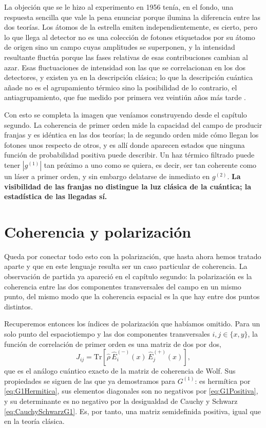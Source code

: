     La objeción que se le hizo al experimento en 1956 tenía, en el fondo, una respuesta sencilla que vale la pena enunciar porque ilumina la diferencia entre las dos teorías. Los átomos de la estrella emiten independientemente, es cierto, pero lo que llega al detector no es una colección de fotones etiquetados por su átomo de origen sino un campo cuyas amplitudes se superponen, y la intensidad resultante fluctúa porque las fases relativas de esas contribuciones cambian al azar. Esas fluctuaciones de intensidad son las que se correlacionan en los dos detectores, y existen ya en la descripción clásica; lo que la descripción cuántica añade no es el agrupamiento térmico sino la posibilidad de lo contrario, el antiagrupamiento, que fue medido por primera vez veintiún años más tarde \citep{kimble1977photon}.

    Con esto se completa la imagen que veníamos construyendo desde el capítulo segundo. La coherencia de primer orden mide la capacidad del campo de producir franjas y es idéntica en las dos teorías; la de segundo orden mide cómo llegan los fotones unos respecto de otros, y es allí donde aparecen estados que ninguna función de probabilidad positiva puede describir. Un haz térmico filtrado puede tener $|g^{(1)}|$ tan próximo a uno como se quiera, es decir, ser tan coherente como un láser a primer orden, y sin embargo delatarse de inmediato en $g^{(2)}$. \textbf{La visibilidad de las franjas no distingue la luz clásica de la cuántica; la estadística de las llegadas sí.}

\section{Coherencia y polarización}

    Queda por conectar todo esto con la polarización, que hasta ahora hemos tratado aparte y que en este lenguaje resulta ser un caso particular de coherencia. La observación de partida ya apareció en el capítulo segundo: la polarización es la coherencia entre las dos componentes transversales del campo en un mismo punto, del mismo modo que la coherencia espacial es la que hay entre dos puntos distintos.

    Recuperemos entonces los índices de polarización que habíamos omitido. Para un solo punto del espaciotiempo y las dos componentes transversales $i,j \in \{x,y\}$, la función de correlación de primer orden es una matriz de dos por dos,
    \begin{equation}\label{eq:MatrizCoherenciaCuantica}
        J_{ij} = \mathrm{Tr}\left[\hat{\rho}\,\hat{E}^{(-)}_{i}(x)\,\hat{E}^{(+)}_{j}(x)\right],
    \end{equation}
    que es el análogo cuántico exacto de la matriz de coherencia de Wolf. Sus propiedades se siguen de las que ya demostramos para $G^{(1)}$: es hermítica por \eqref{eq:G1Hermitica}, sus elementos diagonales son no negativos por \eqref{eq:G1Positiva}, y su determinante es no negativo por la desigualdad de Cauchy y Schwarz \eqref{eq:CauchySchwarzG1}. Es, por tanto, una matriz semidefinida positiva, igual que en la teoría clásica.

